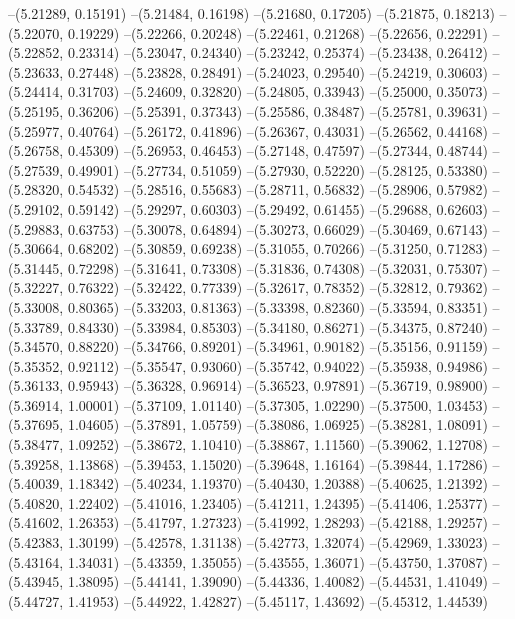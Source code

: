--(5.21289, 0.15191)
--(5.21484, 0.16198)
--(5.21680, 0.17205)
--(5.21875, 0.18213)
--(5.22070, 0.19229)
--(5.22266, 0.20248)
--(5.22461, 0.21268)
--(5.22656, 0.22291)
--(5.22852, 0.23314)
--(5.23047, 0.24340)
--(5.23242, 0.25374)
--(5.23438, 0.26412)
--(5.23633, 0.27448)
--(5.23828, 0.28491)
--(5.24023, 0.29540)
--(5.24219, 0.30603)
--(5.24414, 0.31703)
--(5.24609, 0.32820)
--(5.24805, 0.33943)
--(5.25000, 0.35073)
--(5.25195, 0.36206)
--(5.25391, 0.37343)
--(5.25586, 0.38487)
--(5.25781, 0.39631)
--(5.25977, 0.40764)
--(5.26172, 0.41896)
--(5.26367, 0.43031)
--(5.26562, 0.44168)
--(5.26758, 0.45309)
--(5.26953, 0.46453)
--(5.27148, 0.47597)
--(5.27344, 0.48744)
--(5.27539, 0.49901)
--(5.27734, 0.51059)
--(5.27930, 0.52220)
--(5.28125, 0.53380)
--(5.28320, 0.54532)
--(5.28516, 0.55683)
--(5.28711, 0.56832)
--(5.28906, 0.57982)
--(5.29102, 0.59142)
--(5.29297, 0.60303)
--(5.29492, 0.61455)
--(5.29688, 0.62603)
--(5.29883, 0.63753)
--(5.30078, 0.64894)
--(5.30273, 0.66029)
--(5.30469, 0.67143)
--(5.30664, 0.68202)
--(5.30859, 0.69238)
--(5.31055, 0.70266)
--(5.31250, 0.71283)
--(5.31445, 0.72298)
--(5.31641, 0.73308)
--(5.31836, 0.74308)
--(5.32031, 0.75307)
--(5.32227, 0.76322)
--(5.32422, 0.77339)
--(5.32617, 0.78352)
--(5.32812, 0.79362)
--(5.33008, 0.80365)
--(5.33203, 0.81363)
--(5.33398, 0.82360)
--(5.33594, 0.83351)
--(5.33789, 0.84330)
--(5.33984, 0.85303)
--(5.34180, 0.86271)
--(5.34375, 0.87240)
--(5.34570, 0.88220)
--(5.34766, 0.89201)
--(5.34961, 0.90182)
--(5.35156, 0.91159)
--(5.35352, 0.92112)
--(5.35547, 0.93060)
--(5.35742, 0.94022)
--(5.35938, 0.94986)
--(5.36133, 0.95943)
--(5.36328, 0.96914)
--(5.36523, 0.97891)
--(5.36719, 0.98900)
--(5.36914, 1.00001)
--(5.37109, 1.01140)
--(5.37305, 1.02290)
--(5.37500, 1.03453)
--(5.37695, 1.04605)
--(5.37891, 1.05759)
--(5.38086, 1.06925)
--(5.38281, 1.08091)
--(5.38477, 1.09252)
--(5.38672, 1.10410)
--(5.38867, 1.11560)
--(5.39062, 1.12708)
--(5.39258, 1.13868)
--(5.39453, 1.15020)
--(5.39648, 1.16164)
--(5.39844, 1.17286)
--(5.40039, 1.18342)
--(5.40234, 1.19370)
--(5.40430, 1.20388)
--(5.40625, 1.21392)
--(5.40820, 1.22402)
--(5.41016, 1.23405)
--(5.41211, 1.24395)
--(5.41406, 1.25377)
--(5.41602, 1.26353)
--(5.41797, 1.27323)
--(5.41992, 1.28293)
--(5.42188, 1.29257)
--(5.42383, 1.30199)
--(5.42578, 1.31138)
--(5.42773, 1.32074)
--(5.42969, 1.33023)
--(5.43164, 1.34031)
--(5.43359, 1.35055)
--(5.43555, 1.36071)
--(5.43750, 1.37087)
--(5.43945, 1.38095)
--(5.44141, 1.39090)
--(5.44336, 1.40082)
--(5.44531, 1.41049)
--(5.44727, 1.41953)
--(5.44922, 1.42827)
--(5.45117, 1.43692)
--(5.45312, 1.44539)
